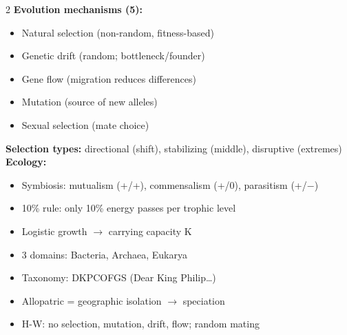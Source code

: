 \documentclass[11pt, letterpaper]{article}
\begin{document}
\begin{tcolorbox}[colback=part2bg, colframe=sectiongreen,
  title={\bfseries Evolution, Classification \& Ecology}, arc=3pt, boxrule=1pt]
\footnotesize
\begin{multicols}{2}
\textbf{Evolution mechanisms (5):}
\begin{itemize}[noitemsep, leftmargin=*]
  \item Natural selection (non-random, fitness-based)
  \item Genetic drift (random; bottleneck/founder)
  \item Gene flow (migration reduces differences)
  \item Mutation (source of new alleles)
  \item Sexual selection (mate choice)
\end{itemize}
\textbf{Selection types:} directional (shift), stabilizing (middle), disruptive (extremes)
\columnbreak
\textbf{Ecology:}
\begin{itemize}[noitemsep, leftmargin=*]
  \item Symbiosis: mutualism (+/+), commensalism (+/0), parasitism (+/$-$)
  \item 10\% rule: only 10\% energy passes per trophic level
  \item Logistic growth $\to$ carrying capacity K
  \item 3 domains: Bacteria, Archaea, Eukarya
  \item Taxonomy: DKPCOFGS (Dear King Philip\ldots)
  \item Allopatric = geographic isolation $\to$ speciation
  \item H-W: no selection, mutation, drift, flow; random mating
\end{itemize}
\end{multicols}
\end{tcolorbox}
\end{document}
